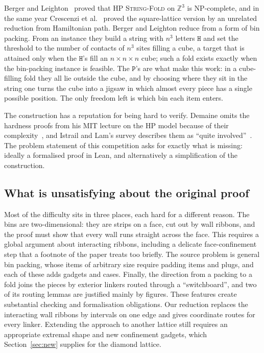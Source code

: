 \documentclass[11pt,letterpaper]{article}
\theoremstyle{definition}
\theoremstyle{remark}
\newcommand{\Hh}{\mathtt{H}}
\newcommand{\Pp}{\mathtt{P}}
\newcommand{\Z}{\mathbb{Z}}
\newcommand{\prob}[1]{\textup{\textsc{#1}}}
\begin{document}
Berger and Leighton~\cite{BL98} proved that \prob{HP String-Fold} on $\Z^3$ is NP-complete, and in
the same year Crescenzi et al.~\cite{CGPPY98} proved the square-lattice version by an unrelated
reduction from Hamiltonian path. Berger and Leighton reduce from a form of bin packing. From an
instance they build a string with $n^3$ letters $\Hh$ and set the threshold to the number of contacts
of $n^3$ sites filling a cube, a target that is attained only when the $\Hh$'s fill an
$n\times n\times n$ cube; such a fold exists exactly when the bin-packing instance is feasible. The
$\Pp$'s are what make this work: in a cube-filling fold they all lie outside the cube, and by choosing
where they sit in the string one turns the cube into a jigsaw in which almost every piece has a
single possible position. The only freedom left is which bin each item enters.

The construction has a reputation for being hard to verify. Demaine omits the hardness proofs from
his MIT lecture on the HP model because of their complexity~\cite[transcript, p.~3]{Demaine12}, and
Istrail and Lam's survey describes them as ``quite involved''~\cite{IL09}. The problem statement of
this competition asks for exactly what is missing: ideally a formalised proof in Lean, and
alternatively a simplification of the construction.

\subsection{What is unsatisfying about the original proof}

Most of the difficulty sits in three places, each hard for a different reason. The bins are
two-dimensional: they are strips on a face, cut out by wall ribbons, and the proof must show that
every wall runs straight across the face. This requires a global argument about interacting ribbons,
including a delicate face-confinement step that a footnote of the paper treats too briefly. The source problem is general
bin packing, whose items of arbitrary size require padding items and plugs, and each of these adds
gadgets and cases. Finally, the direction from a packing to a fold joins the pieces by exterior
linkers routed through a ``switchboard'', and two of its routing lemmas are justified mainly by
figures. These features create substantial checking and formalisation obligations. Our reduction
replaces the interacting wall ribbons by intervals on one edge and gives coordinate routes for every
linker. Extending the approach to another lattice still requires an appropriate extremal shape and
new confinement gadgets, which Section~\ref{sec:new} supplies for the diamond lattice.
\end{document}
